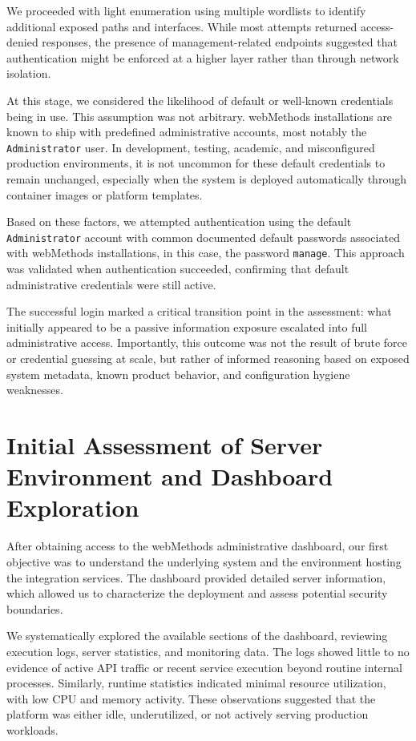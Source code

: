 \documentclass[12pt,a4paper]{report}
\begin{document}
We proceeded with light enumeration using multiple wordlists to identify additional exposed paths and interfaces. While most attempts returned access-denied responses, the presence of management-related endpoints suggested that authentication might be enforced at a higher layer rather than through network isolation.

At this stage, we considered the likelihood of default or well-known credentials being in use. This assumption was not arbitrary. webMethods installations are known to ship with predefined administrative accounts, most notably the \texttt{Administrator} user. In development, testing, academic, and misconfigured production environments, it is not uncommon for these default credentials to remain unchanged, especially when the system is deployed automatically through container images or platform templates.

Based on these factors, we attempted authentication using the default \texttt{Administrator} account with common documented default passwords associated with webMethods installations, in this case, the password  \texttt{manage}. This approach was validated when authentication succeeded, confirming that default administrative credentials were still active.

The successful login marked a critical transition point in the assessment: what initially appeared to be a passive information exposure escalated into full administrative access. Importantly, this outcome was not the result of brute force or credential guessing at scale, but rather of informed reasoning based on exposed system metadata, known product behavior, and configuration hygiene weaknesses.


\clearpage
\section{Initial Assessment of Server Environment and Dashboard Exploration}

After obtaining access to the webMethods administrative dashboard, our first objective was to understand the underlying system and the environment hosting the integration services. The dashboard provided detailed server information, which allowed us to characterize the deployment and assess potential security boundaries.

We systematically explored the available sections of the dashboard, reviewing execution logs, server statistics, and monitoring data. The logs showed little to no evidence of active API traffic or recent service execution beyond routine internal processes. Similarly, runtime statistics indicated minimal resource utilization, with low CPU and memory activity. These observations suggested that the platform was either idle, underutilized, or not actively serving production workloads.
\end{document}
